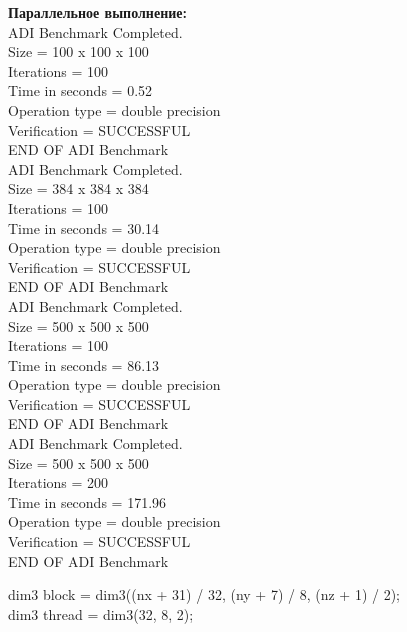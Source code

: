 \documentclass[a4paper,12pt,titlepage,draft]{article}
\begin{document}
\begin{minipage}{.45\textwidth}
\textbf{Параллельное выполнение:}\\

 ADI Benchmark Completed.\\
 Size            =  100 x  100 x  100\\
 Iterations      =                100\\
 Time in seconds =               0.52\\
 Operation type  =   double precision\\
 Verification    =         SUCCESSFUL\\
 END OF ADI Benchmark\\

 ADI Benchmark Completed.\\
 Size            =  384 x  384 x  384\\
 Iterations      =                100\\
 Time in seconds =              30.14\\
 Operation type  =   double precision\\
 Verification    =         SUCCESSFUL\\
 END OF ADI Benchmark\\

 ADI Benchmark Completed.\\
 Size            =  500 x  500 x  500\\
 Iterations      =                100\\
 Time in seconds =              86.13\\
 Operation type  =   double precision\\
 Verification    =         SUCCESSFUL\\
 END OF ADI Benchmark\\

 ADI Benchmark Completed.\\
 Size            =  500 x  500 x  500\\
 Iterations      =                200\\
 Time in seconds =             171.96\\
 Operation type  =   double precision\\
 Verification    =         SUCCESSFUL\\
 END OF ADI Benchmark\\

\end{minipage}
\newpage
\begin{center}
    dim3 block = dim3((nx + 31) / 32, (ny + 7) / 8, (nz + 1) / 2);\\
    dim3 thread = dim3(32, 8, 2);\\
\end{center}
\end{document}
